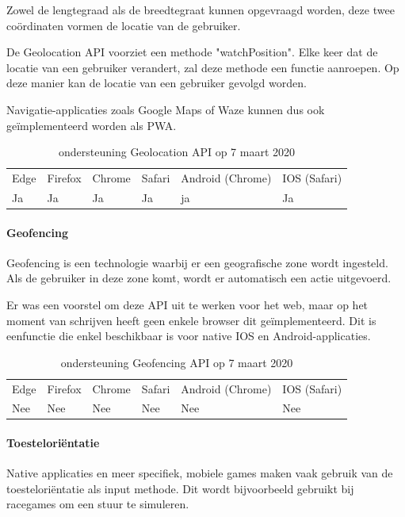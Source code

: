 Zowel de lengtegraad als de breedtegraat kunnen opgevraagd worden, deze twee coördinaten vormen de locatie van de gebruiker.


De Geolocation API voorziet een methode "watchPosition". Elke keer dat de locatie van een gebruiker verandert, zal deze methode een functie aanroepen. Op deze manier kan de locatie van een gebruiker gevolgd worden.

Navigatie-applicaties zoals Google Maps of Waze kunnen dus ook geïmplementeerd worden als PWA.

\begin{table}[H]
	\centering
	\begin{tabular}{llllll}
		Edge & Firefox & Chrome & Safari & Android (Chrome) & IOS (Safari) \\
		Ja   & Ja      &  Ja     & Ja     & ja               & Ja          
	\end{tabular}	
	\caption{ondersteuning Geolocation API op 7 maart 2020}
\end{table}


\paragraph{Geofencing}
Geofencing is een technologie waarbij er een geografische zone wordt ingesteld. Als de gebruiker in deze zone komt, wordt er automatisch een actie uitgevoerd. 

Er was een voorstel om deze API \autocite{Kruisselbrink2017} uit te werken voor het web, maar op het moment van schrijven heeft geen enkele browser dit geïmplementeerd. Dit is eenfunctie die enkel beschikbaar is voor native IOS en Android-applicaties.

\begin{table}[H]
	\centering
	\begin{tabular}{llllll}
		Edge & Firefox & Chrome & Safari & Android (Chrome) & IOS (Safari) \\
		Nee   & Nee      &  Nee     & Nee     & Nee               & Nee          
	\end{tabular}	
	\caption{ondersteuning Geofencing API op 7 maart 2020}
\end{table}

\paragraph{Toesteloriëntatie }

Native applicaties en meer specifiek, mobiele games maken vaak gebruik van de toesteloriëntatie als input methode. Dit wordt bijvoorbeeld gebruikt bij racegames om een stuur te simuleren.

